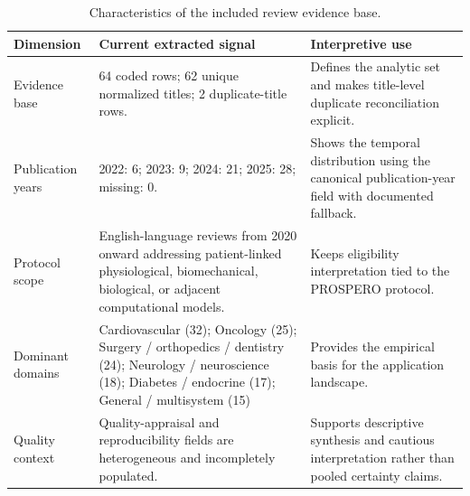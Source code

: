 \begin{table}[htbp]
\centering
\small
\caption{Characteristics of the included review evidence base.}
\label{tab:characteristics}
\begin{tabularx}{\textwidth}{@{}>{\raggedright\arraybackslash}p{}YY@{}}
\toprule
\textbf{Dimension} & \textbf{Current extracted signal} & \textbf{Interpretive use} \\
\midrule
Evidence base & 64 coded rows; 62 unique normalized titles; 2 duplicate-title rows. & Defines the analytic set and makes title-level duplicate reconciliation explicit. \\
Publication years & 2022: 6; 2023: 9; 2024: 21; 2025: 28; missing: 0. & Shows the temporal distribution using the canonical publication-year field with documented fallback. \\
Protocol scope & English-language reviews from 2020 onward addressing patient-linked physiological, biomechanical, biological, or adjacent computational models. & Keeps eligibility interpretation tied to the PROSPERO protocol. \\
Dominant domains & Cardiovascular (32); Oncology (25); Surgery / orthopedics / dentistry (24); Neurology / neuroscience (18); Diabetes / endocrine (17); General / multisystem (15) & Provides the empirical basis for the application landscape. \\
Quality context & Quality-appraisal and reproducibility fields are heterogeneous and incompletely populated. & Supports descriptive synthesis and cautious interpretation rather than pooled certainty claims. \\
\bottomrule
\end{tabularx}
\end{table}
